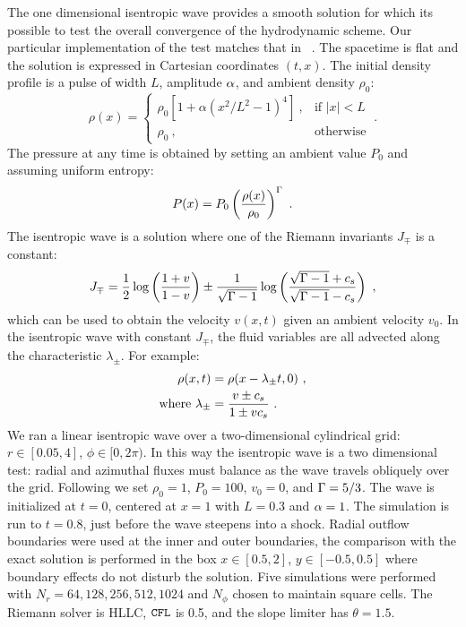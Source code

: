 The one dimensional isentropic wave provides a smooth solution for which its possible to test the overall convergence of the hydrodynamic scheme.  Our particular implementation of the test matches that in \ram\ \citep{Zhang06}.  The spacetime is flat and the solution is expressed in Cartesian coordinates $(t,x)$.  The initial density profile is a pulse of width $L$, amplitude $\alpha$, and ambient density $\rho_0$:
\begin{equation}
	\rho(x) = \left\{\begin{matrix} \rho_0\left[1 + \alpha \left(x^2/L^2-1\right)^4\right]\ , & \text{if } |x| < L \\
							\rho_0\ , & \text{otherwise} \end{matrix} \right . \ .
\end{equation}
The pressure at any time is obtained by setting an ambient value $P_0$ and assuming uniform entropy:
\begin{equation}
	P(x) = P_0 \left(\frac{\rho(x)}{\rho_0}\right)^\Gamma\ .
\end{equation}
The isentropic wave is a solution where one of the Riemann invariants $J_\mp$ is a constant:
\begin{equation}
	J_\mp = \frac{1}{2}\log\left(\frac{1+v}{1-v}\right) \pm \frac{1}{\sqrt{\Gamma-1}}\log \left(\frac{\sqrt{\Gamma-1} + c_s}{\sqrt{\Gamma-1}-c_s}\right)\ ,
\end{equation}
which can be used to obtain the velocity $v(x,t)$ given an ambient velocity $v_0$.  In the isentropic wave with constant $J_\mp$, the fluid variables are all advected along the characteristic $\lambda_\pm$. For example:
\begin{align}
	\rho(x,t) &= \rho(x - \lambda_\pm t, 0) \ , \eqlabel{isenExact} \\
	\text{where } \lambda_\pm &= \frac{v \pm c_s}{1\pm v c_s}\ .
\end{align} 
We ran a linear isentropic wave over a two-dimensional cylindrical grid: $r\in[0.05,4]$, $\phi\in[0,2\pi)$.  In this way the isentropic wave is a two dimensional test: radial and azimuthal fluxes must balance as the wave travels obliquely over the grid.  Following \citet{Zhang06} we set $\rho_0 =1$, $P_0=100$, $v_0=0$, and $\Gamma=5/3$.  The wave is initialized at $t=0$, centered at $x=1$ with $L=0.3$ and $\alpha=1$.  The simulation is run to $t=0.8$, just before the wave steepens into a shock.  Radial outflow boundaries were used at the inner and outer boundaries, the comparison with the exact solution is performed in the box $x\in[0.5,2]$, $y\in[-0.5,0.5]$ where boundary effects do not disturb the solution. Five simulations were performed with $N_r = 64, 128, 256, 512, 1024$ and $N_\phi$ chosen to maintain square cells.  The Riemann solver is HLLC, $\mathtt{CFL}$ is 0.5, and the slope limiter has $\theta=1.5$.

